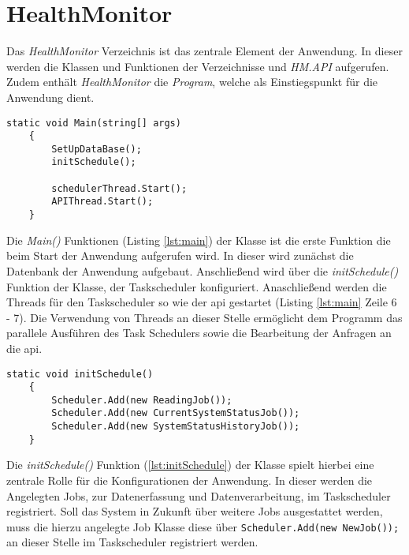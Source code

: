 \section{HealthMonitor}
Das \textit{HealthMonitor} Verzeichnis ist das zentrale Element der Anwendung. In dieser werden die Klassen und Funktionen der Verzeichnisse  und \textit{HM.API} aufgerufen. Zudem enthält \textit{HealthMonitor} die \textit{Program}, welche als Einstiegspunkt für die Anwendung dient. \\
\begin{lstlisting}[caption={Einstiegspunkt der Anwendung}, label={lst:main}]
    static void Main(string[] args) 
    {
        SetUpDataBase();
        initSchedule();
        
        schedulerThread.Start();
        APIThread.Start();
    }
\end{lstlisting}
Die \textit{Main()} Funktionen (Listing \ref{lst:main}) der Klasse ist die erste Funktion die beim Start der Anwendung aufgerufen wird. In dieser wird zunächst die Datenbank der Anwendung aufgebaut. Anschließend wird über die \textit{initSchedule()} Funktion der Klasse, der Taskscheduler konfiguriert. Anaschließend werden die Threads für den Taskscheduler so wie der \ac{api} gestartet (Listing \ref{lst:main} Zeile 6 - 7). Die Verwendung von Threads an dieser Stelle ermöglicht dem Programm das parallele Ausführen des Task Schedulers sowie die Bearbeitung der Anfragen an die \ac{api}.
\begin{lstlisting}[caption={Registrierung der Jobs im Taskscheduler}, label={lst:initSchedule}]
    static void initSchedule() 
    {
        Scheduler.Add(new ReadingJob());
        Scheduler.Add(new CurrentSystemStatusJob());
        Scheduler.Add(new SystemStatusHistoryJob());
    }
\end{lstlisting}
Die \textit{initSchedule()} Funktion (\ref{lst:initSchedule}) der Klasse spielt hierbei eine zentrale Rolle für die Konfigurationen der Anwendung. In dieser werden die Angelegten Jobs, zur Datenerfassung und Datenverarbeitung, im Taskscheduler registriert. Soll das System in Zukunft über weitere Jobs ausgestattet werden, muss die hierzu angelegte Job Klasse diese über \lstinline$Scheduler.Add(new NewJob());$ an dieser Stelle im Taskscheduler registriert werden.   